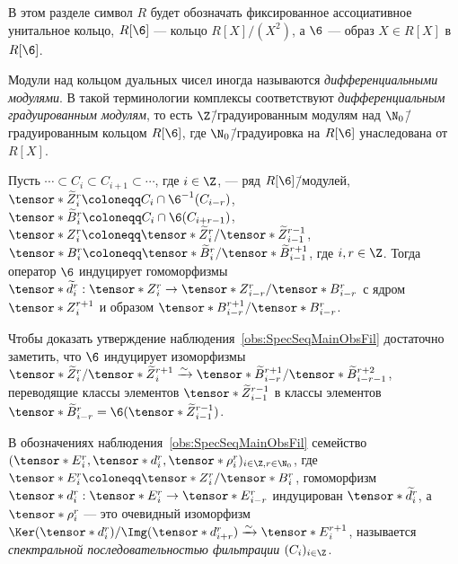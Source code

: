 \documentclass[
	extrafontsizes,
	11pt,
	hyphens,
]{memoir}
\begin{document}
\begin{convention}
В этом разделе символ \(R\) будет обозначать фиксированное ассоциативное унитальное кольцо, \(R[\6]\) --- кольцо \(R[X]/(X^2)\),
а \(\6\) --- образ \(X \in R[X]\) в \(R[\6]\).
\end{convention}

\begin{remark}
Модули над кольцом дуальных чисел иногда называются \emph{дифференциальными модулями}. В такой терминологии комплексы соответствуют \emph{дифференциальным градуированным модулям},
то есть \(\Z\)\=/градуированным модулям над \(\N_0\)\=/градуированным кольцом \(R[\6]\), где \(\N_0\)\=/градуировка на \(R[\6]\) унаследована от \(R[X]\).
\end{remark}

\begin{observation}
Пусть
\(
\cdots{} \subset C_{i} \subset C_{i+1} \subset \cdots{}
\),
где \(i \in \Z\),
--- ряд \(R[\6]\)\=/модулей,
\(\tensor*{\widetilde{Z}}{^r_{i}} \coloneqq C_{i} \cap \6^{-1}(C_{i-r})\),
\(\tensor*{\widetilde{B}}{^r_{i}} \coloneqq C_{i} \cap \6(C_{i+r-1})\),
\(\tensor*{Z}{^r_{i}} \coloneqq \tensor*{\widetilde{Z}}{^r_{i}} / \tensor*{\widetilde{Z}}{^{r-1}_{i-1}}\),
\(\tensor*{B}{^r_{i}} \coloneqq \tensor*{\widetilde{B}}{^r_{i}} / \tensor*{\widetilde{B}}{^{r+1}_{i-1}}\),
где \(i, r \in \Z\).%
\label{obs:SpecSeqMainObsFil}
Тогда оператор \(\6\) индуцирует гомоморфизмы
\(
\tensor*{\widetilde{d}}{^r_{i}} :
\tensor*{Z}{^r_{i}}
\to
\tensor*{Z}{^r_{i-r}}
/
\tensor*{B}{^r_{i-r}}
\)
с ядром \(\tensor*{Z}{^{r+1}_{i}}\)
и образом \(\tensor*{B}{^{r+1}_{i-r}} / \tensor*{B}{^r_{i-r}}\).
\end{observation}

\begin{remark}
Чтобы доказать утверждение наблюдения~\ref{obs:SpecSeqMainObsFil} достаточно заметить, что \(\6\) индуцирует изоморфизмы
\(
\tensor*{\widetilde{Z}}{^r_{i}}
/
\tensor*{\widetilde{Z}}{^{r+1}_{i}}
\xrightarrow{\sim}
\tensor*{\widetilde{B}}{^{r+1}_{i-r}}
/
\tensor*{\widetilde{B}}{^{r+2}_{i-r-1}}
\),
переводящие классы элементов
\(\tensor*{\widetilde{Z}}{^{r-1}_{i-1}}\)
в классы элементов
\(\tensor*{\widetilde{B}}{^r_{i-r}} =
\6(\tensor*{\widetilde{Z}}{^{r-1}_{i-1}})\).
\end{remark}

\begin{definition}
В обозначениях%
\label{def:SpecSeqFiltFil}
наблюдения~\ref{obs:SpecSeqMainObsFil}
семейство
\(
(
\tensor*{E}{^r_{i}},
\tensor*{d}{^r_{i}},
\tensor*{\rho}{^r_{i}}
)_{i \in \Z, r \in \N_0}
\),
где
\(\tensor*{E}{^r_{i}} \coloneqq \tensor*{Z}{^r_{i}} / \tensor*{B}{^r_{i}}\),
гомоморфизм
\(
\tensor*{d}{^r_{i}} :
\tensor*{E}{^r_{i}}
\to
\tensor*{E}{^r_{i-r}}
\)
индуцирован
\(\tensor*{\widetilde{d}}{^r_{i}}\),
а
\(
\tensor*{\rho}{^r_{i}}
\)
--- это очевидный изоморфизм
\(
\Ker(\tensor*{d}{^r_{i}})
/
\Img(\tensor*{d}{^r_{i+r}})
\xrightarrow{\sim}
\tensor*{E}{^{r+1}_{i}}
\),
называется \emph{спектральной последовательностью фильтрации} \((C_i)_{i \in \Z}\).
\end{definition}
\end{document}
